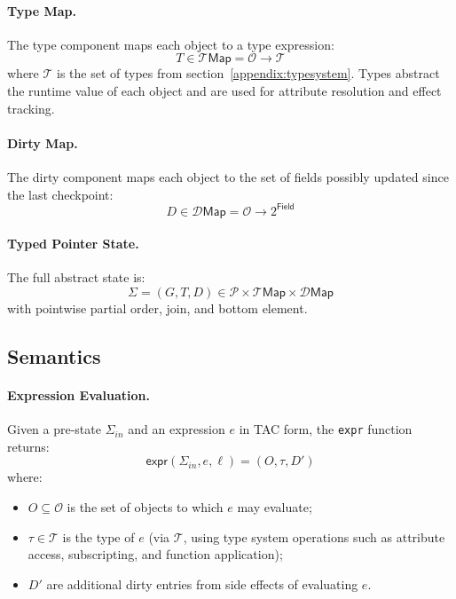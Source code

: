 \paragraph{Type Map.}
The type component maps each object to a type expression:
\[
T \in \mathcal{T}\mathsf{Map} = \mathcal{O} \to \mathcal{T}
\]
where $\mathcal{T}$ is the set of types from section~\ref{appendix:typesystem}.  
Types abstract the runtime value of each object and are used for attribute resolution and effect tracking.

\paragraph{Dirty Map.}
The dirty component maps each object to the set of fields possibly updated since the last checkpoint:
\[
D \in \mathcal{D}\mathsf{Map} = \mathcal{O} \to 2^{\mathsf{Field}}
\]

\paragraph{Typed Pointer State.}
The full abstract state is:
\[
\Sigma = (G, T, D) \in \mathcal{P} \times \mathcal{T}\mathsf{Map} \times \mathcal{D}\mathsf{Map}
\]
with pointwise partial order, join, and bottom element.

\subsection{Semantics}

\paragraph{Expression Evaluation.}
Given a pre-state $\Sigma_{\mathit{in}}$ and an expression $e$ in TAC form, the \texttt{expr} function returns:
\[
\mathsf{expr}(\Sigma_{\mathit{in}}, e, \ell) = (O, \tau, D')
\]
where:
\begin{itemize}
\item $O \subseteq \mathcal{O}$ is the set of objects to which $e$ may evaluate;
\item $\tau \in \mathcal{T}$ is the type of $e$ (via $\mathcal{T}$, using type system operations such as attribute access, subscripting, and function application);
\item $D'$ are additional dirty entries from side effects of evaluating $e$.
\end{itemize}

